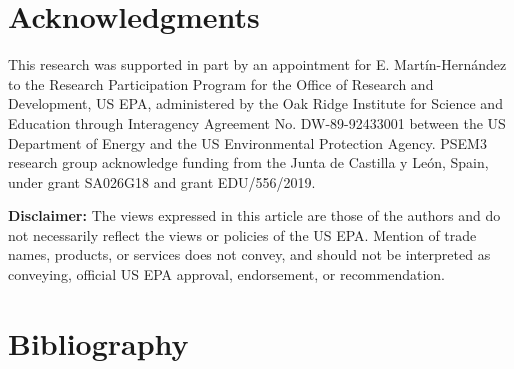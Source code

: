 \begin{refsection}[referencesCh4]
\section*{Acknowledgments} \label{section:Acknowledgments}
This research was supported in part by an appointment for E. Mart\'{i}n-Hern\'{a}ndez to the Research Participation Program for the Office of Research and Development, US EPA, administered by the Oak Ridge Institute for Science and Education through Interagency Agreement No. DW-89-92433001 between the US Department of Energy and the US Environmental Protection Agency. PSEM3 research group acknowledge funding from the Junta de Castilla y Le\'{o}n, Spain, under grant SA026G18 and grant EDU/556/2019.

\textbf{Disclaimer:} The views expressed in this article are those of the authors and do not necessarily reflect the views or policies of the US EPA. Mention of trade names, products, or services does not convey, and should not be interpreted as conveying, official US EPA approval, endorsement, or recommendation.

\section*{Bibliography}

\printbibliography[heading=none]
\end{refsection}
